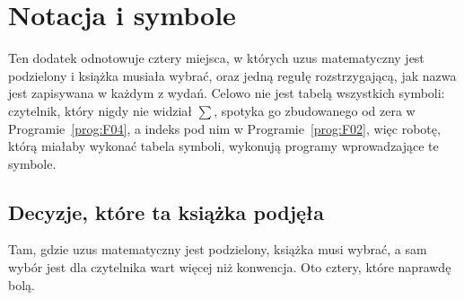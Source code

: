 
\chapter{Notacja i symbole}
\label{app:B}

\noindent
Ten dodatek odnotowuje cztery miejsca, w których uzus matematyczny jest
podzielony i książka musiała wybrać, oraz jedną regułę rozstrzygającą, jak
nazwa jest zapisywana w każdym z wydań. Celowo nie jest tabelą wszystkich
symboli: czytelnik, który nigdy nie widział $\sum$, spotyka go zbudowanego od
zera w Programie~\ref{prog:F04}, a indeks pod nim w Programie~\ref{prog:F02},
więc robotę, którą miałaby wykonać tabela symboli, wykonują programy
wprowadzające te symbole.

\section{Decyzje, które ta książka podjęła}
\label{sec:appB-decisions}

\noindent
Tam, gdzie uzus matematyczny jest podzielony, książka musi wybrać, a sam wybór
jest dla czytelnika wart więcej niż konwencja. Oto cztery, które naprawdę
bolą.

